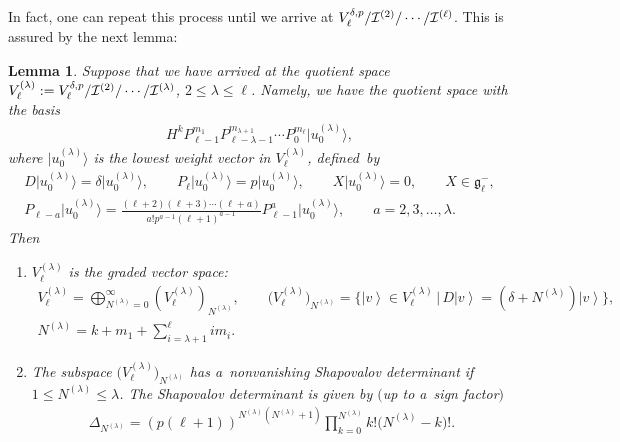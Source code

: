 \documentclass[11pt]{article}
\numberwithin{equation}{section}
\newtheorem{lemma}{Lemma}
\def\ket#1{\left| #1\right\rangle}
\begin{document}
In fact, one can repeat this process until we arrive at $ V^{\delta,p}_{\ell}/{\cal I}^{(2)}/\cdots/{\cal I}^{(\ell)}$.
This is assured by the next lemma:
\begin{lemma}
\label{lemma5}
Suppose that we have arrived at the quotient space $ V_{\ell}^{(\lambda)}:= V^{\delta,p}_{\ell}/{\cal
I}^{(2)}/\cdots/{\cal I}^{(\lambda)}$, $2 \leq \lambda \leq \ell$.
Namely, we have the quotient space with the basis
\begin{gather*}
H^k P_{\ell-1}^{m_1} P_{\ell-\lambda-1}^{m_{\lambda+1}} \cdots P_0^{m_{\ell}} \big|u_0^{(\lambda)}\big\rangle ,
\end{gather*}
where $ \big|u_0^{(\lambda)}\big\rangle  $ is the lowest weight vector in $ V_{\ell}^{(\lambda)} $, defined~by
\begin{gather}
    D \big|u_0^{(\lambda)}\big\rangle  = \delta \big|u_0^{(\lambda)}\big\rangle ,
\qquad
P_{\ell} \big|u_0^{(\lambda)}\big\rangle  = p \big|u_0^{(\lambda)}\big\rangle ,
\qquad
X \big|u_0^{(\lambda)}\big\rangle  = 0, \qquad X \in {\mathfrak g}_{\ell}^-,
\nonumber
\\      P_{\ell-a} \big|u_0^{(\lambda)}\big\rangle  = \frac{(\ell+2) (\ell+3) \cdots (\ell+a)}{a!   p^{a-1}   (\ell+1)^{a-1}}
P_{\ell-1}^a \big|u_0^{(\lambda)}\big\rangle ,
\qquad
a = 2, 3, \dots, \lambda.
\label{Assumption-lambda}
\end{gather}
Then
\begin{enumerate}\itemsep=0pt
\item[$i)$] $ V_{\ell}^{(\lambda)} $ is the graded vector space:
\begin{gather*}
    V_{\ell}^{(\lambda)} = \bigoplus_{N^{(\lambda)}=0}^{\infty} (V_{\ell}^{(\lambda)})_{N^{(\lambda)}},
\qquad
\big(V_{\ell}^{(\lambda)}\big)_{N^{(\lambda)}} = \big\{ \ket{v} \in V_{\ell}^{(\lambda)} \, | \, D \ket{v} = (\delta +
N^{(\lambda)}) \ket{v} \big\},
\nonumber
\\
    N^{(\lambda)} = k + m_1 + \sum\limits_{i=\lambda+1}^{\ell} i m_i.
\end{gather*}
\item[$ii)$] The subspace $ \big(V_{\ell}^{(\lambda)}\big)_{N^{(\lambda)}} $ has a~nonvanishing Shapovalov determinant if $ 1 \leq
N^{(\lambda)} \leq \lambda$.
The Shapovalov determinant is given by $($up to a~sign factor$)$
\begin{gather}
\Delta_{N^{(\lambda)}} = (p  (\ell+1))^{N^{(\lambda)}(N^{(\lambda)}+1)} \prod\limits_{k=0}^{N^{(\lambda)}} k!
\big(N^{(\lambda)}-k\big)!.
\label{KDinQuotient}

\end{gather}
\end{enumerate}
\end{lemma}
\end{document}
